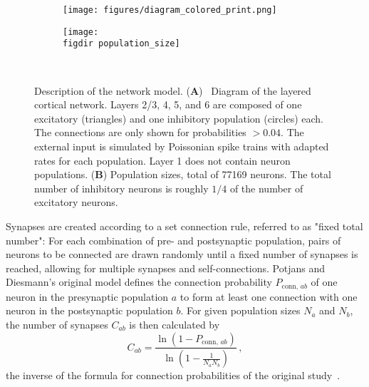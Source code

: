 \begin{figure}[tb]
    \centering 
    \begin{subfigure}[b]{0.6\textwidth} 
        \texttt{[image: figures/diagram\_colored\_print.png]}
        \label{fig:diagram}
    \end{subfigure}
    \begin{subfigure}[b]{0.35\textwidth}
        \texttt{[image: \\figdir population\_size]}
        \label{fig:population_size}
    \end{subfigure} ~
    \caption[Diagram of model and population sizes]{
        Description of the network model. 
        (\textbf{A})~%
        Diagram of the layered cortical network. 
        Layers 2/3, 4, 5, and 6 are composed of one excitatory
        (triangles) and one inhibitory population (circles) each.
        The connections are only shown for probabilities $>0.04$. 
        The external input is simulated by Poissonian spike trains
        with adapted rates for each population. 
        Layer 1 does not contain neuron populations.
        (\textbf{B})
        Population sizes, total of 77169 neurons. The total number of inhibitory neurons is roughly
        $1 / 4$ of the number of excitatory neurons. 
    }
    \label{fig:model_description} 
\end{figure}
Synapses are created according to a set connection rule, referred to as 
"fixed total number":
For each combination of pre- and postsynaptic population, pairs of neurons to be connected are drawn
randomly until a fixed number of synapses is reached, 
allowing for multiple synapses and self-connections. 
Potjans and Diesmann's original model defines the connection probability $P_{\text{conn}, \,ab}$ 
of one neuron in the presynaptic population $a$ to form at least one connection with one neuron in 
the postsynaptic population $b$. For given population sizes $N_a$ and $N_b$, the number of 
synapses $C_{ab}$ is then calculated by
\begin{equation}
    C_{ab} = \frac{\ln \left( 1 - P_{\text{conn}, \,ab} \right)}{\ln \left( 1 - \frac{1}{N_a N_b} \right)} \, ,
    \label{eq:synapse_numbers}
\end{equation}
the inverse of the formula for connection probabilities of the original study~\cite{potjans2014}.

